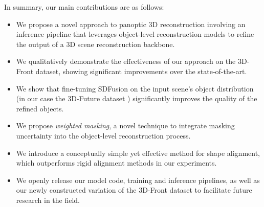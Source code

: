 In summary, our main contributions are as follows:
\begin{itemize}
    \item We propose a novel approach to panoptic 3D reconstruction involving an inference pipeline that leverages object-level reconstruction models to refine the output of a 3D scene reconstruction backbone.
    \item We qualitatively demonstrate the effectiveness of our approach on the 3D-Front \citep{fu20213d} dataset, showing significant improvements over the state-of-the-art.
    \item We show that fine-tuning SDFusion \citep{cheng2023sdfusion} on the input scene's object distribution (in our case the 3D-Future dataset \citep{fu20213e}) significantly improves the quality of the refined objects.
    \item We propose \emph{weighted masking}, a novel technique to integrate masking uncertainty into the object-level reconstruction process.
    \item We introduce a conceptually simple yet effective method for shape alignment, which outperforms rigid alignment methods in our experiments.
    \item We openly release our model code, training and inference pipelines, as well as our newly constructed variation of the 3D-Front dataset to facilitate future research in the field.
\end{itemize}
